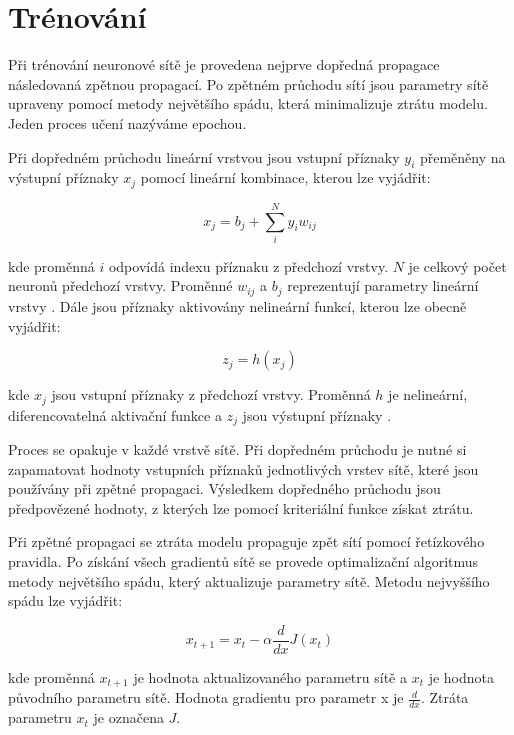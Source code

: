 \documentclass[FM,BP]{tulthesis}
\begin{document}
\section{Trénování}
Při trénování neuronové sítě je provedena nejprve dopředná propagace následovaná zpětnou propagací. Po zpětném průchodu sítí jsou parametry sítě upraveny pomocí metody největšího spádu, která minimalizuje ztrátu modelu. Jeden proces učení nazýváme epochou.

Při dopředném průchodu lineární vrstvou jsou vstupní příznaky $ y_i $ přeměněny na výstupní příznaky $ x_j $ pomocí lineární kombinace, kterou lze vyjádřit:

\begin{equation}
\label{eqn:linear_layer}
x_j = b_j + \sum_{i}^{N} y_i w_{ij}
\end{equation}

kde proměnná $ i $ odpovídá indexu příznaku z předchozí vrstvy. $ N $ je celkový počet neuronů předchozí vrstvy. Proměnné $ w_{ij} $ a $ b_j $ reprezentují parametry lineární vrstvy \cite{MATEJU2021327}. Dále jsou příznaky aktivovány nelineární funkcí, kterou lze obecně vyjádřit:

\begin{equation}
\label{eqn:activation}
z_j = h(x_j)
\end{equation}

kde $ x_j $ jsou vstupní příznaky z předchozí vrstvy. Proměnná $ h $ je nelineární, diferencovatelná aktivační funkce a $ z_j $ jsou výstupní příznaky \cite{DBLP:books/lib/Bishop07}.

Proces se opakuje v každé vrstvě sítě. Při dopředném průchodu je nutné si zapamatovat hodnoty vstupních příznaků jednotlivých vrstev sítě, které jsou používány při zpětné propagaci. Výsledkem dopředného průchodu jsou předpovězené hodnoty, z kterých lze pomocí kriteriální funkce získat ztrátu.

Při zpětné propagaci se ztráta modelu propaguje zpět sítí pomocí řetízkového pravidla. Po získání všech gradientů sítě se provede optimalizační algoritmus metody největšího spádu, který aktualizuje parametry sítě. Metodu nejvyššího spádu lze vyjádřit:

\begin{equation}
\label{eqn:gradient_descent}
x_{t+1} = x_t - \alpha \frac{d}{dx}J(x_t)
\end{equation}

kde proměnná $ x_{t+1} $ je hodnota aktualizovaného parametru sítě a $ x_t $ je hodnota původního parametru sítě. Hodnota gradientu pro parametr x je $ \frac{d}{dx} $. Ztráta parametru $ x_t $ je označena $ J $.
\end{document}
